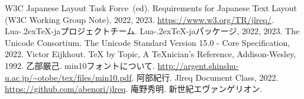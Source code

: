 \documentclass[twoside]{ltjsarticle}
\def\LuaTeX{Lua\kern-.2ex\TeX}
\begin{document}
\begin{thebibliography}{9}
     W3C Japanese Layout Task Force~(ed). \newblock Requirements for Japanese Text Layout (W3C Working Group Note), 2022, 2023. \newblock \url{https://www.w3.org/TR/jlreq/}.
     \LuaTeX-jaプロジェクトチーム. \newblock \LuaTeX-jaパッケージ, 2022, 2023.
     The Unicode Consortium. \newblock The Unicode Standard Version 15.0 - Core Specification, 2022.
     Victor Eijkhout. \newblock \TeX{} by Topic, A \TeX nician's Reference, Addison-Wesley, 1992.
     乙部厳己. \newblock min10フォントについて. \newblock \url{http://argent.shinshu-u.ac.jp/~otobe/tex/files/min10.pdf}.
     阿部紀行. \newblock Jlreq Document Class, 2022. \newblock \url{https://github.com/abenori/jlreq}.
     庵野秀明. \newblock 新世紀エヴァンゲリオン.
\end{thebibliography}
\end{document}
